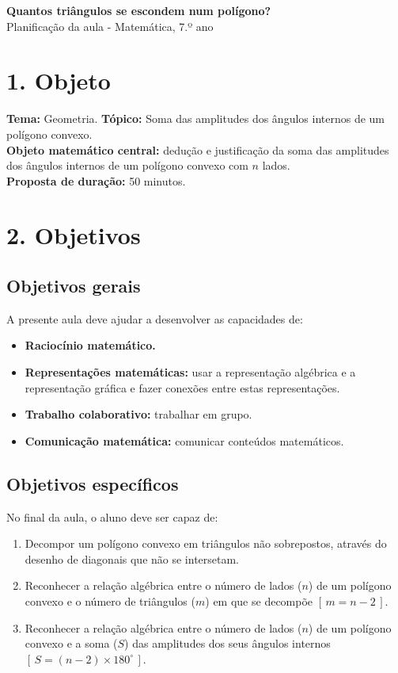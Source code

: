 

\begin{center}
{\large\bfseries\color{azulPDMI}Quantos triângulos se escondem num polígono?}\\[3pt]
{\small Planificação da aula - Matemática, 7.º ano}
\end{center}

\section*{1. Objeto}
\textbf{Tema:} Geometria. \textbf{Tópico:} Soma das amplitudes dos ângulos internos de um polígono convexo.\\
\textbf{Objeto matemático central:} dedução e justificação da soma das amplitudes dos ângulos internos de um polígono convexo com $n$ lados.\\
\textbf{Proposta de duração:} 50 minutos.

\section*{2. Objetivos}
\subsection*{Objetivos gerais}
A presente aula deve ajudar a desenvolver as capacidades de:
\begin{itemize}[leftmargin=*,itemsep=3pt]
\item \textbf{Raciocínio matemático.}
\item \textbf{Representações matemáticas:} usar a representação algébrica e a representação gráfica e fazer conexões entre estas representações.
\item \textbf{Trabalho colaborativo:} trabalhar em grupo.
\item \textbf{Comunicação matemática:} comunicar conteúdos matemáticos.
\end{itemize}

\subsection*{Objetivos específicos}
No final da aula, o aluno deve ser capaz de:
\begin{enumerate}[label=\textbf{OE\arabic*.},leftmargin=*,itemsep=4pt]
\item Decompor um polígono convexo em triângulos não sobrepostos, através do desenho de diagonais que não se intersetam.
\item Reconhecer a relação algébrica entre o número de lados ($n$) de um polígono convexo e o número de triângulos ($m$) em que se decompõe $\left[\,m=n-2\,\right]$.
\item Reconhecer a relação algébrica entre o número de lados ($n$) de um polígono convexo e a soma ($S$) das amplitudes dos seus ângulos internos $\left[\,S=(n-2)\times180^\circ\,\right]$.
\end{enumerate}


